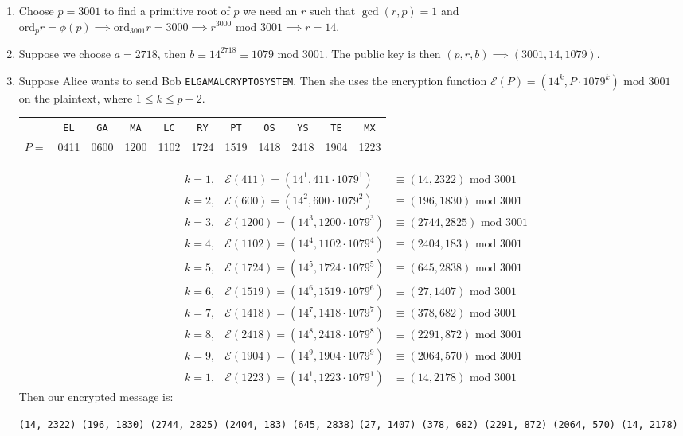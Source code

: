 \documentclass[class=article, crop=false]{standalone}
\def\E{{\mathcal E}}
\def\ord{{\text{ord}}}
\begin{document}
\subsubsection{}
\begin{enumerate}
  \item
    Choose $p=3001$ to find a primitive root of $p$ we need an $r$ such that $\gcd(r,p)=1$
    and $\ord_p r = \phi(p)\implies \ord_{3001} r = 3000\implies r^{3000} \mbox{ mod }3001\implies r = 14$.

  \item
    Suppose we choose $a = 2718$, then $b\equiv 14^{2718} \equiv 1079\mbox{ mod } 3001$.
    The public key is then $(p,r,b)\implies(3001,14,1079)$.

  \item
    Suppose Alice wants to send Bob \verb|ELGAMALCRYPTOSYSTEM|. Then she uses
    the encryption function $\mathcal{E}(P) = (14^{k}, P\cdot 1079^{k})\mbox{ mod }3001$ on the plaintext, where $1\leq k\leq p-2$.

    \begin{table}[htb]
      \centering
      \begin{tabular}{ccccccccccc}
        &\verb|EL| &\verb|GA| &\verb|MA| &\verb|LC| &\verb|RY| &\verb|PT| &\verb|OS| &\verb|YS| &\verb|TE| &\verb|MX|\\
        $P =$ &0411 &0600 &1200 &1102 &1724 &1519 &1418 &2418 &1904 &1223
      \end{tabular}
    \end{table}
    \begin{align*}
      &k = 1, &\E(411)  = (14^{1},  411\cdot 1079^{1}) &\equiv (14, 2322) \mbox{ mod } 3001 \\
      &k = 2, &\E(600)  = (14^{2},  600\cdot 1079^{2}) &\equiv (196, 1830) \mbox{ mod } 3001 \\
      &k = 3, &\E(1200) = (14^{3}, 1200\cdot 1079^{3}) &\equiv (2744, 2825) \mbox{ mod } 3001 \\
      &k = 4, &\E(1102) = (14^{4}, 1102\cdot 1079^{4}) &\equiv (2404, 183) \mbox{ mod } 3001 \\
      &k = 5, &\E(1724) = (14^{5}, 1724\cdot 1079^{5}) &\equiv (645, 2838) \mbox{ mod } 3001 \\
      &k = 6, &\E(1519) = (14^{6}, 1519\cdot 1079^{6}) &\equiv (27, 1407) \mbox{ mod } 3001 \\
      &k = 7, &\E(1418) = (14^{7}, 1418\cdot 1079^{7}) &\equiv (378, 682) \mbox{ mod } 3001 \\
      &k = 8, &\E(2418) = (14^{8}, 2418\cdot 1079^{8}) &\equiv (2291, 872) \mbox{ mod } 3001 \\
      &k = 9, &\E(1904) = (14^{9}, 1904\cdot 1079^{9}) &\equiv (2064, 570) \mbox{ mod } 3001 \\
      &k = 1, &\E(1223) = (14^{1}, 1223\cdot 1079^{1}) &\equiv (14, 2178) \mbox{ mod } 3001
    \end{align*}
    Then our encrypted message is:
    \begin{center}
      \verb|(14, 2322) (196, 1830) (2744, 2825) (2404, 183) (645, 2838)|
      \verb|(27, 1407) (378, 682) (2291, 872) (2064, 570) (14, 2178)|
    \end{center}


\end{enumerate}
\end{document}
